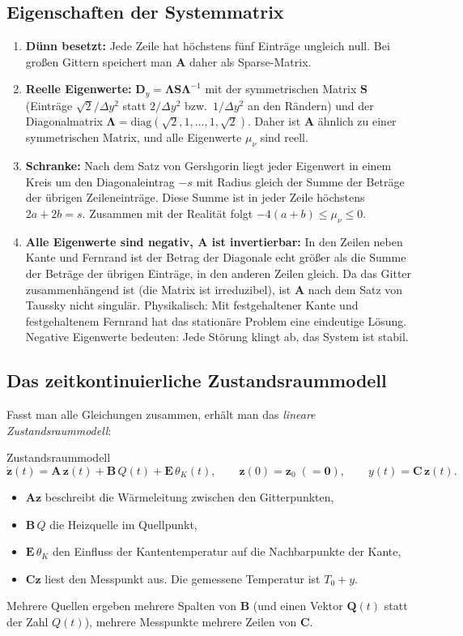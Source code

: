 \documentclass[11pt,a4paper]{article}
\numberwithin{equation}{section}
\newcommand{\dy}{\Delta y}
\newcommand{\thK}{\theta_{K}}
\newcommand{\mA}{\mathbf{A}}
\newcommand{\mB}{\mathbf{B}}
\newcommand{\mE}{\mathbf{E}}
\newcommand{\mC}{\mathbf{C}}
\newcommand{\mDy}{\mathbf{D}_{y}}
\newcommand{\vz}{\mathbf{z}}
\newcommand{\vQ}{\mathbf{Q}}
\begin{document}
\subsection{Eigenschaften der Systemmatrix}

\begin{enumerate}
 \item \textbf{Dünn besetzt:} Jede Zeile hat höchstens fünf Einträge ungleich null. Bei großen Gittern speichert man $\mA$ daher als Sparse-Matrix.
 \item \textbf{Reelle Eigenwerte:} $\mDy=\symbf{\Lambda}\mathbf{S}\symbf{\Lambda}^{-1}$ mit der symmetrischen Matrix $\mathbf{S}$ (Einträge $\sqrt2/\dy^2$ statt $2/\dy^2$ bzw.\ $1/\dy^2$ an den Rändern) und der Diagonalmatrix $\symbf{\Lambda}=\mathrm{diag}(\sqrt2,1,\dots,1,\sqrt2)$. Daher ist $\mA$ ähnlich zu einer symmetrischen Matrix, und alle Eigenwerte $\mu_\nu$ sind reell.
 \item \textbf{Schranke:} Nach dem Satz von Gershgorin liegt jeder Eigenwert in einem Kreis um den Diagonaleintrag $-s$ mit Radius gleich der Summe der Beträge der übrigen Zeileneinträge. Diese Summe ist in jeder Zeile höchstens $2a+2b=s$. Zusammen mit der Realität folgt $-4(a+b)\le\mu_\nu\le0$.
 \item \textbf{Alle Eigenwerte sind negativ, $\mA$ ist invertierbar:} In den Zeilen neben Kante und Fernrand ist der Betrag der Diagonale echt größer als die Summe der Beträge der übrigen Einträge, in den anderen Zeilen gleich. Da das Gitter zusammenhängend ist (die Matrix ist irreduzibel), ist $\mA$ nach dem Satz von Taussky nicht singulär. Physikalisch: Mit festgehaltener Kante und festgehaltenem Fernrand hat das stationäre Problem eine eindeutige Lösung. Negative Eigenwerte bedeuten: Jede Störung klingt ab, das System ist stabil.
\end{enumerate}

\subsection{Das zeitkontinuierliche Zustandsraummodell}

Fasst man alle Gleichungen zusammen, erhält man das \emph{lineare Zustandsraummodell}:
\begin{ergebnis}{Zustandsraummodell}
\begin{equation}
 \dot{\vz}(t)=\mA\,\vz(t)+\mB\,Q(t)+\mE\,\thK(t),\qquad \vz(0)=\vz_0\;(=\mathbf 0),\qquad y(t)=\mC\,\vz(t).
 \label{eq:zr}
\end{equation}
\end{ergebnis}
\begin{itemize}
 \item $\mA\vz$ beschreibt die Wärmeleitung zwischen den Gitterpunkten,
 \item $\mB\,Q$ die Heizquelle im Quellpunkt,
 \item $\mE\,\thK$ den Einfluss der Kantentemperatur auf die Nachbarpunkte der Kante,
 \item $\mC\vz$ liest den Messpunkt aus. Die gemessene Temperatur ist $T_0+y$.
\end{itemize}
Mehrere Quellen ergeben mehrere Spalten von $\mB$ (und einen Vektor $\vQ(t)$ statt der Zahl $Q(t)$), mehrere Messpunkte mehrere Zeilen von $\mC$.
\end{document}
